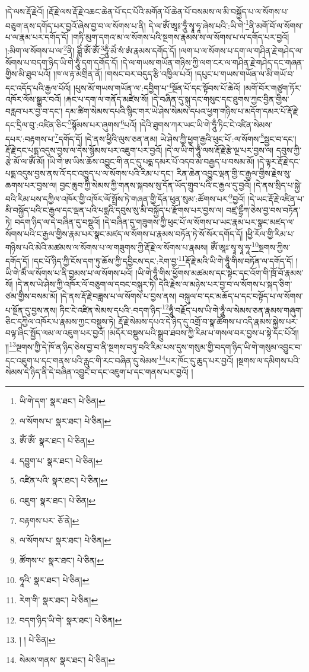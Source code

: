 །དེ་ལས་རྡོ་རྗེའོ། །རྡོ་རྗེ་ལས་རྡོ་རྗེ་འཆང་ཆེན་པོ་དང་པོའི་མགོན་པོ་ཆེན་པོ་བསམས་ལ་མི་བསྐྱོད་པ་ལ་སོགས་པ་བཅུག་ནས་དགོད་པར་བྱའོ་ཞེས་བྱ་བ་ལ་སོགས་པ་ནི། དེ་ལ་ཨོཾ་ཨཱཿ་ཧཱུྃ་སྭཱ་ཧཱ་ཞེས་པའི་:ཡི་གེ་\footnote{ཡི་གེ་དག་  སྣར་ཐང་།  པེ་ཅིན། }ནི་མགོ་བོ་ལ་སོགས་པ་ལ་རྣམ་པར་དགོད་དོ། །གཏི་མུག་དགའ་མ་ལ་སོགས་པའི་སྔགས་རྣམས་ས་ལ་སོགས་པ་ལ་དགོད་པར་བྱའོ། །:མིག་ལ་སོགས་པ་ལ་\footnote{ལ་སོགས་པ་  སྣར་ཐང་།  པེ་ཅིན། }ནི། ཐླིཾ་ཨོཾ་ཨོཾ་\footnote{ཨོཾ་ཨོཾ་  སྣར་ཐང་།  པེ་ཅིན། }ཧཱུྃ་མེཾ་སཾ་ཨཾ་རྣམས་དགོད་དོ། །ལག་པ་ལ་སོགས་པ་དག་ལ་གཤིན་རྗེ་གཤེད་ལ་སོགས་པ་བདག་ཉིད་ཡི་གེ་ཧཱུྃ་དག་དགོད་དོ། །དེ་ལ་གཡས་གཡོན་གཉིས་ཀྱི་ལག་ངར་ལ་གཤིན་རྗེ་གཤེད་དང་གཞན་གྱིས་མི་ཐུབ་པའོ། །ཁ་ལ་རྟ་མགྲིན་ནོ། །གསང་བར་བདུད་རྩི་འཁྱིལ་པའོ། །དཔུང་པ་གཡས་གཡོན་ལ་མི་གཡོ་བ་དང་འདོད་པའི་རྒྱལ་པོའོ། །པུས་མོ་གཡས་གཡོན་ལ་:དབྱིག་པ་\footnote{དབྱུག་པ་  སྣར་ཐང་།  པེ་ཅིན། }སྔོན་པོ་དང་སྟོབས་པོ་ཆེའོ། །མགོ་བོར་གཙུག་ཏོར་འཁོར་ལོས་སྒྱུར་བའོ། །རྐང་པ་དག་ལ་གནོད་མཛེས་སོ། །དེ་བཞིན་དུ་སྐུ་དང་གསུང་དང་ཐུགས་ཀྱང་བྱིན་གྱིས་བརླབ་པར་བྱ་བ་དང་། དམ་ཚིག་སེམས་དཔའི་སྙིང་གར་ཡེ་ཤེས་སེམས་དཔའ་ཕྱག་གཉིས་པ་མདོག་དམར་པོ་རྡོ་རྗེ་དང་དྲིལ་བུ་:འཛིན་ཅིང་\footnote{འཛིན་པའི་  སྣར་ཐང་།  པེ་ཅིན། }སྙོམས་པར་ཞུགས་\footnote{འཇུག་  སྣར་ཐང་།  པེ་ཅིན། }པའོ། །དེའི་ཐུགས་ཀར་ཡང་ཡི་གེ་ཧཱུྃ་ཏིང་ངེ་འཛིན་སེམས་དཔར་:བརྟགས་པ་\footnote{བརྟགས་པར་  ཅོ་ནེ། }དགོད་དོ། །དེ་ནས་ཕྱིའི་ལུས་ཅན་ནམ། ཡེ་ཤེས་ཀྱི་ཕྱག་རྒྱའི་ཕུང་པོ་:ལ་སོགས་\footnote{ལ་སོགས་པ་  སྣར་ཐང་།  པེ་ཅིན། }སྦྱང་བ་དང་། རྡོ་རྗེ་དང་པདྨ་འདུས་བྱས་ལ་དེས་སྙོམས་པར་འཇུག་པར་བྱའོ། །དེ་ལ་ཡི་གེ་ཧཱུྃ་ལས་རྡོ་རྗེ་རྩེ་ལྔ་པར་བྱས་ལ། དབུས་ཀྱི་རྩེ་མོ་ལ་ཨོཾ་མོ། །ཡི་གེ་ཨ་ཡིས་ཆོས་འབྱུང་གི་ནང་དུ་པདྨ་དམར་པོ་འདབ་མ་བརྒྱད་པ་བསམ་མོ། །དེ་ལྟར་རྡོ་རྗེ་དང་པདྨ་འདུས་བྱས་ནས་འོ་དང་འཁྱུད་པ་ལ་སོགས་པའི་རིམ་པ་དང་། རིན་ཆེན་འབྱུང་ལྡན་གྱི་ང་རྒྱལ་གྱིས་རྗེས་སུ་ཆགས་པར་བྱས་ལ། བྱང་ཆུབ་ཀྱི་སེམས་ཀྱི་གནས་སྐབས་སུ་དོན་ཡོད་གྲུབ་པའི་ང་རྒྱལ་དུ་བྱའོ། །དེ་ནས་སྲིད་པ་སྐྱེ་བའི་རིམ་པས་དཀྱིལ་འཁོར་གྱི་འཁོར་ལོ་སྤྲོས་ཏེ་གཞན་གྱི་དོན་ཕུན་སུམ་:ཚོགས་པར་\footnote{ཚོགས་པ་  སྣར་ཐང་།  པེ་ཅིན། }བྱའོ། །དེ་ཡང་རྡོ་རྗེ་འཛིན་པ་མི་བསྐྱོད་པའི་ང་རྒྱལ་དང་ལྡན་པའི་པདྨའི་དབུས་སུ་མི་བསྐྱོད་པ་རྫོགས་པར་བྱས་ལ། བཛྲ་དྷྲྀཀ་ཅེས་བྱ་བས་བཏོན་ཏེ། བདག་ཉིད་ལ་དེ་བཞིན་དུ་བསྡུའོ། །དེ་བཞིན་དུ་གཟུགས་ཀྱི་ཕུང་པོ་ལ་སོགས་པ་ཡང་རྣམ་པར་སྣང་མཛད་ལ་སོགས་པའི་ང་རྒྱལ་གྱིས་རྣམ་པར་སྣང་མཛད་ལ་སོགས་པ་རྣམས་བཏོན་ཏེ་སོ་སོར་དགོད་དོ། །ཕྱི་རོལ་གྱི་རིམ་པ་གཉིས་པའི་མེའི་མཚམས་ལ་སོགས་པ་ལ་གཟུགས་ཀྱི་རྡོ་རྗེ་ལ་སོགས་པ་རྣམས། ཨོཾ་ཨཱཿ་སྭཱ་སྭཱ་ཧཱ་\footnote{ཧཱའི་  སྣར་ཐང་།  པེ་ཅིན། }སྔགས་ཀྱིས་དགོད་དོ། །དང་པོ་ཉིད་ཀྱི་ངོས་དག་ཏུ་ཆོས་ཀྱི་དབྱིངས་དང་:རེག་བྱ་\footnote{རེག་གི་  སྣར་ཐང་།  པེ་ཅིན། }རྡོ་རྗེ་མའི་ཡི་གེ་ཧཱུྃ་གིས་བཏོན་ལ་དགོད་དོ། །ཡི་གེ་མཻཾ་ལ་སོགས་པ་ནི་བྱམས་པ་ལ་སོགས་པའོ། །ཡི་གེ་ཧཱུྃ་གིས་ཕྱོགས་མཚམས་དང་སྟེང་དང་འོག་གི་ཁྲོ་བོ་རྣམས་སོ། །དེ་ནས་ཡེ་ཤེས་ཀྱི་འཁོར་ལོ་བཅུག་ལ་དབང་བསྐུར་ཏེ། དེའི་རྗེས་ལ་མཉེས་པར་བྱ་བ་ལ་སོགས་པ་སྐད་ཅིག་ཙམ་གྱིས་བསམ་མོ། །དེ་ནས་རྡོ་རྗེ་བཟླས་པ་ལ་སོགས་པ་བྱས་ནས། བསྐུལ་བ་དང་མཆོད་པ་དང་བསྟོད་པ་ལ་སོགས་པ་སྔོན་དུ་བྱས་ནས། ཏིང་ངེ་འཛིན་སེམས་དཔའི་:བདག་ཉིད་\footnote{བདག་ཉིད་ཡི་གེ་  སྣར་ཐང་།  པེ་ཅིན། }ཧཱུྃ་བརྗོད་པས་ཡི་གེ་ཧཱུྃ་ལ་སེམས་ཅན་རྣམས་གཞུག་ཅིང་དཀྱིལ་འཁོར་པ་རྣམས་ཀྱང་བསྡུས་ཏེ། རྡོ་རྗེ་སེམས་དཔའ་དེ་ཉིད་དུ་འགྲོ་བ་སྣ་ཚོགས་པ་འདི་རྣམས་སྐྱེས་པར་བལྟ་ཞིང་སྤྱོད་ལམ་ལ་འཇུག་པར་བྱའོ། །མདོར་བསྡུས་པའི་སྒྲུབ་ཐབས་ཀྱི་རིམ་པ་གསལ་བར་བྱས་པ་སྟེ་དང་པོའོ།། །།\footnote{། །  པེ་ཅིན། }སྔགས་ཀྱི་དེ་ཁོ་ན་ཉིད་ཅེས་བྱ་བ་ནི་སྔགས་བཏུ་བའི་རིམ་པས་དུས་གསུམ་གྱི་བདག་ཉིད་ཡི་གེ་གསུམ་འབྱུང་བ་དང་འཇུག་པ་དང་གནས་པའི་རླུང་གི་རང་བཞིན་དུ་སེམས་\footnote{སེམས་གནས་  སྣར་ཐང་།  པེ་ཅིན། }པར་ཁོང་དུ་ཆུད་པར་བྱའོ། །སྔགས་ལ་དམིགས་པའི་སེམས་དེ་ཉིད་ནི་དེ་བཞིན་འབྱུང་བ་དང་འཇུག་པ་དང་གནས་པར་བྱའོ། །
